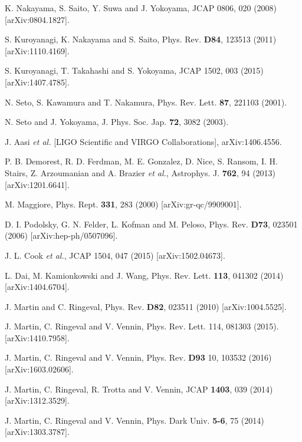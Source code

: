 \documentclass[11pt,a4paper,twoside]{book}
\begin{document}
\begin{thebibliography}{2}
	 K. Nakayama, S. Saito, Y. Suwa and J. Yokoyama, JCAP 0806, 020 (2008) [arXiv:0804.1827].
	
	 S. Kuroyanagi, K. Nakayama and S. Saito, Phys. Rev. \textbf{D84}, 123513 (2011) [arXiv:1110.4169].
	
	 S. Kuroyanagi, T. Takahashi and S. Yokoyama, JCAP 1502, 003 (2015) [arXiv:1407.4785]. 
	
	 N. Seto, S. Kawamura and T. Nakamura, Phys. Rev. Lett. \textbf{87}, 221103 (2001).
	
	 N. Seto and J. Yokoyama, J. Phys. Soc. Jap. \textbf{72}, 3082 (2003).
	
	 J. Aasi \textit{et al.} [LIGO Scientific and VIRGO Collaborations], arXiv:1406.4556.
	
	 P. B. Demorest, R. D. Ferdman, M. E. Gonzalez, D. Nice, S. Ransom, I. H. Stairs, Z. Arzoumanian and A. Brazier \textit{et al.}, Astrophys. J. \textbf{762}, 94 (2013) [arXiv:1201.6641].
		
	 M. Maggiore, Phys. Rept. \textbf{331}, 283 (2000) [arXiv:gr-qc/9909001].	
	
	 D. I. Podolsky, G. N. Felder, L. Kofman and M. Peloso, Phys. Rev. \textbf{D73}, 023501 (2006) [arXiv:hep-ph/0507096].
	
	 J. L. Cook \textit{et al.}, JCAP 1504, 047 (2015) [arXiv:1502.04673].
	
	 L. Dai, M. Kamionkowski and J. Wang, Phys. Rev. Lett. \textbf{113}, 041302 (2014) [arXiv:1404.6704].
	
	 J. Martin and C. Ringeval, Phys. Rev. \textbf{D82}, 023511 (2010) [arXiv:1004.5525].
	
	 J. Martin, C. Ringeval and V. Vennin, Phys. Rev. Lett. 114, 081303 (2015). [arXiv:1410.7958].
	
	 J. Martin, C. Ringeval and V. Vennin, Phys. Rev. \textbf{D93} 10, 103532 (2016) [arXiv:1603.02606].
	
	 J. Martin, C. Ringeval, R. Trotta and V. Vennin, JCAP \textbf{1403}, 039 (2014) [arXiv:1312.3529].
	
	 J. Martin, C. Ringeval and V. Vennin, Phys. Dark Univ. \textbf{5-6}, 75 (2014) [arXiv:1303.3787].
	

\end{thebibliography}
\end{document}
